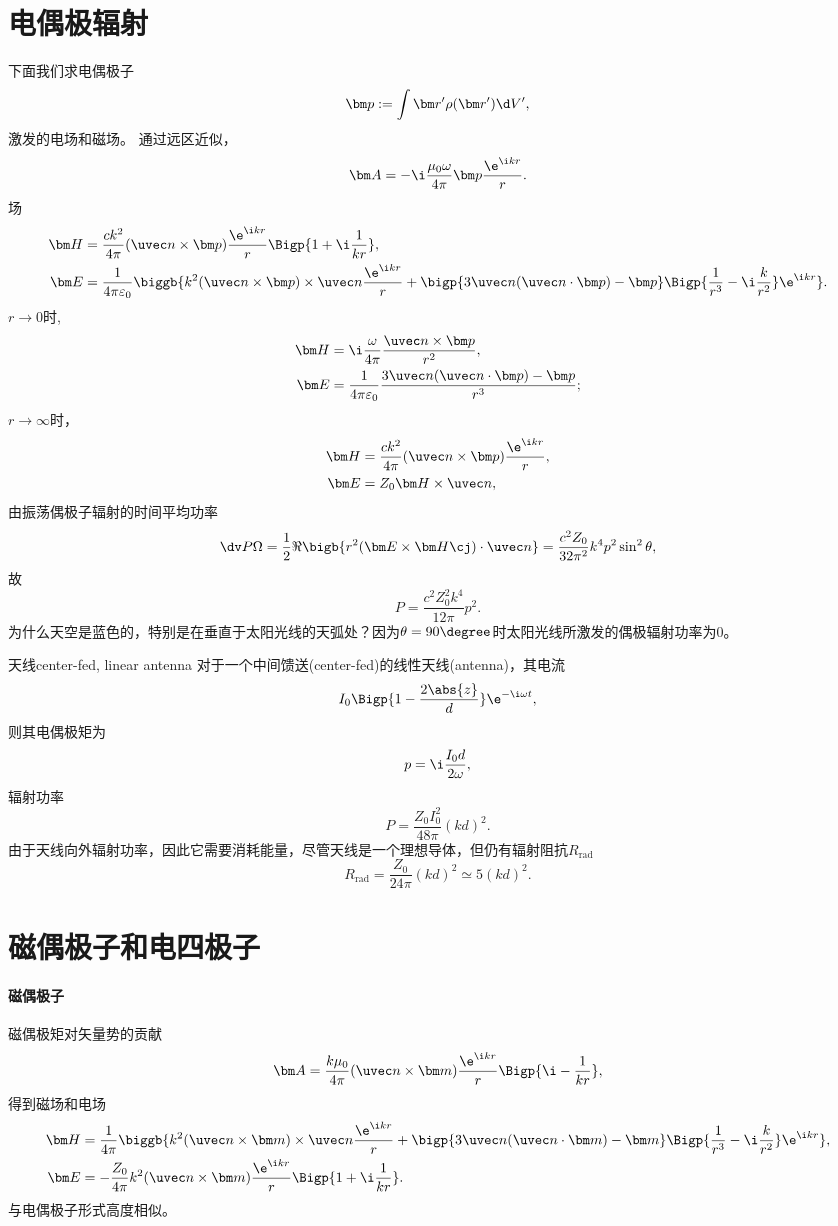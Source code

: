 \section{电偶极辐射}
下面我们求电偶极子
\[
    \bm p:=\int\bm r'\rho(\bm r')\d V',
\]
激发的电场和磁场。
通过远区近似，
\[
    \bm A=-\i\frac{\mu_0\omega}{4\pi}\bm p\frac{\e^{\i kr}}r.
\]
场
\begin{align*}
    \bm H&=\frac{ck^2}{4\pi}(\uvec n\times\bm p)\frac{\e^{\i kr}}r\Bigp{1+\i\frac1{kr}},\\
    \bm E&=\frac1{4\pi\varepsilon_0}\biggb{k^2(\uvec n\times\bm p)\times\uvec n\frac{\e^{\i kr}}r+\bigp{3\uvec n(\uvec n\cdot\bm p)-\bm p}\Bigp{\frac1{r^3}-\i\frac{k}{r^2}}\e^{\i kr}}.
\end{align*}
$r\to 0$时,
\begin{align*}
    \bm H&=\i\frac{\omega}{4\pi}\frac{\uvec n\times\bm p}{r^2},\\
    \bm E&=\frac1{4\pi\varepsilon_0}\frac{3\uvec n(\uvec n\cdot\bm p)-\bm p}{r^3};
\end{align*}
$r\to\infty$时，
\begin{align*}
    \bm H&=\frac{ck^2}{4\pi}(\uvec n\times\bm p)\frac{\e^{\i kr}}r,\\
    \bm E&=Z_0\bm H\times\uvec n,
\end{align*}
由振荡偶极子辐射的时间平均功率
\[
    \dv P\Omega=\frac12\Re\bigb{r^2(\bm E\times\bm H\cj)\cdot\uvec n}=\frac{c^2Z_0}{32\pi^2}k^4p^2\sin^2\theta,
\]
故
\begin{equation}
    P=\frac{c^2Z_0^2k^4}{12\pi}p^2.
\end{equation}
为什么天空是蓝色的，特别是在垂直于太阳光线的天弧处？因为$\theta=90\degree$时太阳光线所激发的偶极辐射功率为0。
\begin{example}{天线}{center-fed, linear antenna}
    对于一个中间馈送(center-fed)的线性天线(antenna)，其电流
    \[
        I_0\Bigp{1-\frac{2\abs{z}}d}\e^{-\i\omega t},
    \]
    则其电偶极矩为
    \[
        p=\i\frac{I_0d}{2\omega},
    \]
    辐射功率
    \[
        P=\frac{Z_0I_0^2}{48\pi}(kd)^2.
    \]
    由于天线向外辐射功率，因此它需要消耗能量，尽管天线是一个理想导体，但仍有辐射阻抗$R_\text{rad}$
    \[
        R_\text{rad}=\frac{Z_0}{24\pi}(kd)^2\simeq 5(kd)^2.
    \]
\end{example}
\section{磁偶极子和电四极子}
\paragraph{磁偶极子}
磁偶极矩对矢量势的贡献
\[
    \bm A=\frac{k\mu_0}{4\pi}(\uvec n\times\bm m)\frac{\e^{\i kr}}r\Bigp{\i-\frac1{kr}},
\]
得到磁场和电场
\begin{align*}
    \bm H&=\frac1{4\pi}\biggb{k^2(\uvec n\times\bm m)\times\uvec n\frac{\e^{\i kr}}r+\bigp{3\uvec n(\uvec n\cdot\bm m)-\bm m}\Bigp{\frac1{r^3}-\i\frac{k}{r^2}}\e^{\i kr}},\\
    \bm E&=-\frac{Z_0}{4\pi}k^2(\uvec n\times\bm m)\frac{\e^{\i kr}}r\Bigp{1+\i\frac1{ kr}}.
\end{align*}
与电偶极子形式高度相似。
